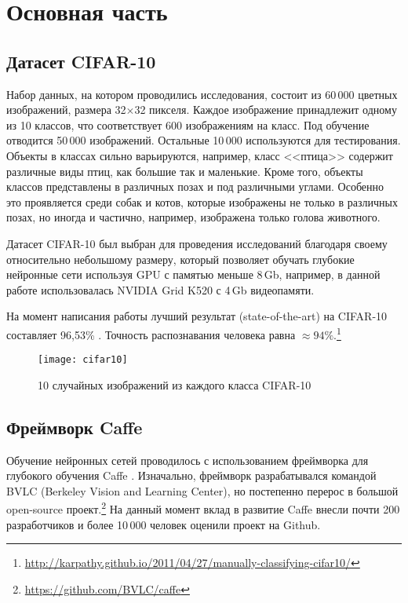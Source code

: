 \section{Основная часть}
\subsection{Датасет CIFAR-10}
Набор данных, на котором проводились исследования, состоит из 60\,000 цветных изображений, размера 
32$\times$32 пикселя. Каждое изображение принадлежит одному из 10 классов, что соответствует 600 изображениям на класс. Под 
обучение отводится 50\,000 изображений. Остальные 10\,000 используются для тестирования. Объекты в классах сильно варьируются, 
например, класс <<птица>> содержит различные виды птиц, как большие так и маленькие. Кроме того, объекты классов представлены в 
различных позах и под различными углами. Особенно это проявляется среди собак и котов, которые изображены не только в различных 
позах, но иногда и частично, например, изображена только голова животного.

Датасет CIFAR-10 \cite{learningmultiple} был выбран для проведения исследований благодаря своему относительно небольшому размеру, 
который позволяет обучать глубокие нейронные сети используя GPU с памятью меньше 8\,Gb, например, в данной работе использовалась 
NVIDIA Grid K520 с 4\,Gb видеопамяти.

На момент написания работы лучший результат (state-of-the-art) на CIFAR-10 составляет 96,53\% \cite{2014arXiv1412}. Точность  
распознавания человека равна $\approx94\%$.\footnote{\url{http://karpathy.github.io/2011/04/27/manually-classifying-cifar10/}}

\begin{figure}[h]
\centering
\texttt{[image: cifar10]}
\caption{10 случайных изображений из каждого класса CIFAR-10}
\end{figure}

\subsection{Фреймворк Caffe}
Обучение нейронных сетей проводилось с использованием фреймворка для глубокого обучения Caffe \cite{jia2014caffe}.
Изначально, фреймворк разрабатывался командой BVLC (Berkeley Vision and Learning Center), но постепенно перерос в большой 
open-source проект.\footnote{\url{https://github.com/BVLC/caffe}} На данный момент вклад в развитие Caffe внесли почти 200 
разработчиков и более 10\,000 человек оценили проект на Github.

